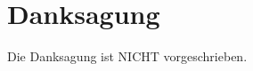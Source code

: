 \chapter*{Danksagung}
\thispagestyle{empty}
\pagestyle{empty}

Die Danksagung ist NICHT vorgeschrieben.


\newpage
